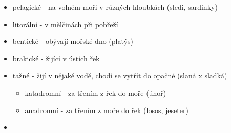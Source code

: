 \documentclass{article}
\begin{document}
\begin{itemize}
  \begin{itemize}
    \item pelagické - na volném moři v různých hloubkách (sledi, sardinky)
    \item litorální - v mělčinách při pobřeží
    \item bentické - obývají mořské dno (platýs)
    \item brakické - žijící v ústích řek
    \item tažné - žijí v nějaké vodě, chodí se vytřít do opačné (slaná x sladká)
    \begin{itemize}
      \item katadromní - za třením z řek do moře (úhoř)
      \item anadromní - za třením z moře do řek (losos, jeseter)
    \end{itemize}
    \item
  \end{itemize}
\end{itemize}
\end{document}
